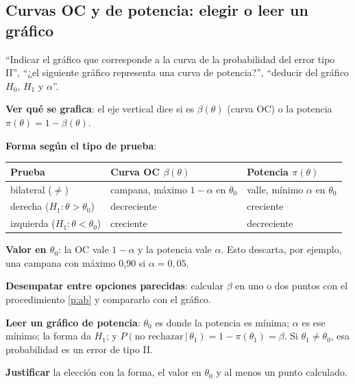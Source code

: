 \subsection{Curvas OC y de potencia: elegir o leer un gráfico}\label{p:curvas}
\begin{cuando}
``Indicar el gráfico que corresponde a la curva de la probabilidad del error tipo II'', ``¿el siguiente gráfico representa una curva de potencia?'', ``deducir del gráfico $H_0$, $H_1$ y $\alpha$''.
\end{cuando}
\begin{pasos}
\begin{pasolista}
\item \textbf{Ver qué se grafica}: el eje vertical dice si es $\beta(\theta)$ (curva OC) o la potencia $\pi(\theta)=1-\beta(\theta)$.
\item \textbf{Forma según el tipo de prueba}:
\begin{center}
\renewcommand{\arraystretch}{1.2}
\begin{tabular}{@{}lll@{}}
\toprule
Prueba & Curva OC $\beta(\theta)$ & Potencia $\pi(\theta)$\\\midrule
bilateral ($\neq$) & campana, máximo $1-\alpha$ en $\theta_0$ & valle, mínimo $\alpha$ en $\theta_0$\\
derecha ($H_1:\theta>\theta_0$) & decreciente & creciente\\
izquierda ($H_1:\theta<\theta_0$) & creciente & decreciente\\\bottomrule
\end{tabular}
\end{center}
\item \textbf{Valor en $\theta_0$}: la OC vale $1-\alpha$ y la potencia vale $\alpha$. Esto descarta, por ejemplo, una campana con máximo 0,90 si $\alpha=0{,}05$.
\item \textbf{Desempatar entre opciones parecidas}: calcular $\beta$ en uno o dos puntos con el procedimiento \ref{p:ab} y compararlo con el gráfico.
\item \textbf{Leer un gráfico de potencia}: $\theta_0$ es donde la potencia es mínima; $\alpha$ es ese mínimo; la forma da $H_1$; y $P(\text{no rechazar}\,|\,\theta_1)=1-\pi(\theta_1)=\beta$. Si $\theta_1\neq\theta_0$, esa probabilidad es un error de tipo II.
\item \textbf{Justificar} la elección con la forma, el valor en $\theta_0$ y al menos un punto calculado.
\end{pasolista}
\end{pasos}
